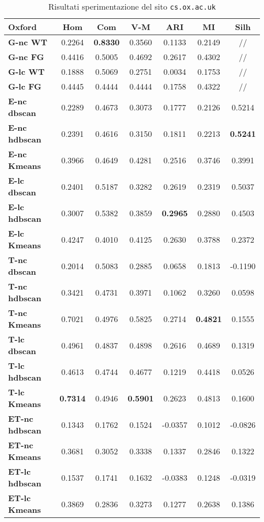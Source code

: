 \begin{table}[H]
	\begin{tabular}{| l | c | c | c | c | c | c |}
	\hline
	\textbf{Oxford}  & \textbf{Hom} & \textbf{Com} & \textbf{V-M}  & \textbf{ARI}  & \textbf{MI} & \textbf{Silh} \\ [2ex] \hline
	\textbf{G-nc WT} & 0.2264 & \textbf{0.8330} & 0.3560 & 0.1133 & 0.2149 & // \\ [2ex]
	 \hline
	\textbf{G-nc FG} & 0.4416 & 0.5005 & 0.4692 & 0.2617 & 0.4302 & // \\ [2ex]
	 \hline	
	\textbf{G-lc WT} & 0.1888 & 0.5069 & 0.2751 & 0.0034 & 0.1753 & // \\ [2ex]
	 \hline	
	\textbf{G-lc FG} & 0.4445 & 0.4444 & 0.4444 & 0.1758 & 0.4322 & // \\ [2ex]
	\hline

	\textbf{E-nc dbscan} & 0.2289 & 0.4673 & 0.3073 & 0.1777 & 0.2126 & 0.5214 \\ [2ex]
	 \hline 
	\textbf{E-nc hdbscan} & 0.2391 & 0.4616 & 0.3150 & 0.1811 & 0.2213 & \textbf{0.5241} \\ [2ex]
	 \hline
	\textbf{E-nc Kmeans} & 0.3966 & 0.4649 & 0.4281 & 0.2516 & 0.3746 & 0.3991 \\ [2ex]
	 \hline	
	\textbf{E-lc dbscan} & 0.2401 & 0.5187 & 0.3282 & 0.2619 & 0.2319 & 0.5037 \\ [2ex]
	\hline
	\textbf{E-lc hdbscan} & 0.3007 & 0.5382 & 0.3859 & \textbf{0.2965} & 0.2880 & 0.4503 \\ [2ex]
	\hline
	\textbf{E-lc Kmeans} & 0.4247 & 0.4010 & 0.4125 & 0.2630 & 0.3788 & 0.2372 \\ [2ex]
	\hline
	
	\textbf{T-nc dbscan} & 0.2014 & 0.5083 & 0.2885 & 0.0658 & 0.1813 & -0.1190 \\ [2ex]
	 \hline 
	\textbf{T-nc hdbscan} & 0.3421 & 0.4731 & 0.3971 & 0.1062 & 0.3260 & 0.0598 \\ [2ex]
	 \hline
	\textbf{T-nc Kmeans} & 0.7021 & 0.4976 & 0.5825 & 0.2714 & \textbf{0.4821} & 0.1555 \\ [2ex]
	 \hline	
	\textbf{T-lc dbscan} & 0.4961 & 0.4837 & 0.4898 & 0.2616 & 0.4689 & 0.1319 \\ [2ex]
	\hline
	\textbf{T-lc hdbscan} & 0.4613 & 0.4744 & 0.4677 & 0.1219 & 0.4418 & 0.0526 \\ [2ex]
	\hline
	\textbf{T-lc Kmeans} & \textbf{0.7314} & 0.4946 & \textbf{0.5901} & 0.2623 & 0.4813 & 0.1600 \\ [2ex]
	\hline
	
	\textbf{ET-nc hdbscan} & 0.1343 & 0.1762 & 0.1524 & -0.0357 & 0.1012 & -0.0826 \\ [2ex]
	 \hline
	\textbf{ET-nc Kmeans} & 0.3681 & 0.3052 & 0.3338 & 0.1337 & 0.2846 & 0.1322 \\ [2ex]
	 \hline	
	\textbf{ET-lc hdbscan} & 0.1537 & 0.1741 & 0.1632 & -0.0383 & 0.1248 & -0.0319 \\ [2ex]
	\hline
	\textbf{ET-lc Kmeans} & 0.3869 & 0.2836 & 0.3273 & 0.1277 & 0.2638 & 0.1386 \\ [2ex]
	\hline
	\end{tabular}
	\caption{Risultati sperimentazione del sito \texttt{cs.ox.ac.uk}}
	\label{metricheOx}
\end{table}
